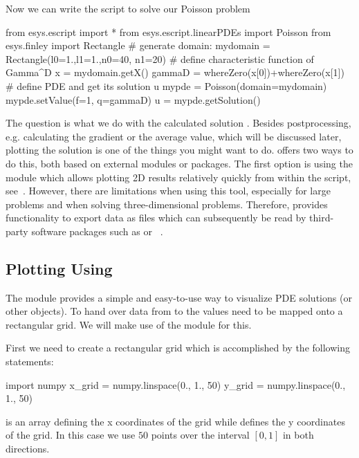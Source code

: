 Now we can write the script to solve our Poisson problem
\begin{python}
  from esys.escript import *
  from esys.escript.linearPDEs import Poisson
  from esys.finley import Rectangle
  # generate domain:
  mydomain = Rectangle(l0=1.,l1=1.,n0=40, n1=20)
  # define characteristic function of Gamma^D
  x = mydomain.getX()
  gammaD = whereZero(x[0])+whereZero(x[1])
  # define PDE and get its solution u
  mypde = Poisson(domain=mydomain)
  mypde.setValue(f=1, q=gammaD)
  u = mypde.getSolution()
\end{python}
The question is what we do with the calculated solution .
Besides postprocessing, e.g. calculating the gradient or the average value,
which will be discussed later, plotting the solution is one of the things you
might want to do.
\escript offers two ways to do this, both based on external modules or packages.
The first option is using the \MATPLOTLIB module which allows plotting 2D
results relatively quickly from within the \PYTHON script, see~\cite{matplotlib}.
However, there are limitations when using this tool, especially for large
problems and when solving three-dimensional problems.
Therefore, \escript provides functionality to export data as files which can
subsequently be read by third-party software packages such as
\mayavi\cite{mayavi} or \VisIt~\cite{VisIt}.

\subsection{Plotting Using \MATPLOTLIB}
The \MATPLOTLIB module provides a simple and easy-to-use way to visualize PDE
solutions (or other \Data objects).
To hand over data from \escript to \MATPLOTLIB the values need to be mapped onto
a rectangular grid. We will make use of the \numpy module for this.

First we need to create a rectangular grid which is accomplished by the following statements:
\begin{python}
  import numpy
  x_grid = numpy.linspace(0., 1., 50)
  y_grid = numpy.linspace(0., 1., 50)
\end{python}
 is an array defining the x coordinates of the grid while
 defines the y coordinates of the grid.
In this case we use $50$ points over the interval $[0,1]$ in both directions. 

